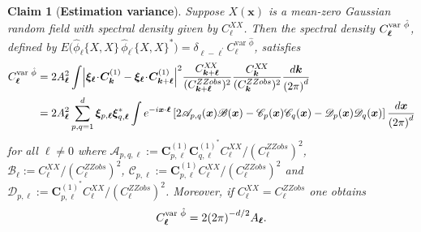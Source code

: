 \documentclass[10pt,noinfoline]{imsart}
\newtheorem{claim}{Claim}
\newcommand{\bs}{\boldsymbol}
\begin{document}
%
%

\begin{claim}[{\bf Estimation variance}]\label{thm: quantify the var fluctuations of hat phi}
    Suppose $X(\bs x)$ is a mean-zero Gaussian random field with spectral density given by $C^{X\!X}_{\bs \ell}$.
    Then the spectral density $C_{\bs\ell}^{\text{\rm var }\hat{\phi}}$, defined by $E\big(\hat\phi_{\bs \ell}\{X,\!X\} \, \hat\phi_{\bs \ell^\prime}\{X,\!X\}^*\big) =  \delta^{\phantom{*}}_{\bs \ell-\bs \ell^\prime} C^{\text{var }\hat\phi}_{\bs \ell}$, satisfies
    \begin{align}
        C_{\bs\ell}^{\text{\rm var }\hat{\phi}}
        &= 2 A_{\bs\ell}^2
        \int
        \Bigl|\bs\xi_{\bs\ell}\!\cdot\!\bs C^{{(1)}}_{\bs k} - \bs\xi_{\bs\ell}\!\cdot\! \bs C^{{(1)}}_{\bs k+\bs \ell}\Bigr|^2
        \frac{C^{X\!X}_{\bs k+\bs\ell}}{(C^{ZZobs}_{\bs k+\bs\ell})^2}
        \frac{C^{X\!X}_{\bs k}}{(C^{ZZobs}_{\bs k})^2}
         \frac{d\bs k}{{(2\pi)}^{d}} \label{appendix, claim raw var} \\
        &= 2 A_{\bs\ell}^2  \sum_{p,q = 1}^d\bs\xi_{p,\bs\ell}\bs\xi^*_{q,\bs\ell}\int e^{-i\bs x\cdot\bs \ell} \left[2\mathscr A_{p,q}(\bs x)\mathscr B(\bs x)  - \mathscr C_{p}(\bs x)\mathscr C_{q}(\bs x) -  \mathscr D_{p}(\bs x)\mathscr D_{q}(\bs x)\right]  \frac{d\bs x}{{(2\pi)}^{d}} \label{appendix, claim fast var}
    \end{align}
    for all $\bs \ell\neq 0$
    where $\mathscr A_{p,q, \bs \ell}:= \bs C^{(1)}_{p,\bs \ell} \bs C^{{(1)}^*}_{q,\bs \ell} C^{X\!X}_{\bs\ell} / (C^{ZZobs}_{\bs \ell})^2$, $\mathscr B_\ell:=  C^{X\!X}_{\bs\ell} / (C^{ZZobs}_{\bs\ell})^2$, $\mathscr C_{p,\bs\ell}:= \bs C^{(1)}_{p,\bs\ell}  C^{X\!X}_{\bs\ell} / (C^{ZZobs}_{\bs\ell})^2$ and $\mathscr D_{p,\bs\ell}:= \bs C^{{(1)}^*}_{p,\bs\ell}  C^{X\!X}_{\bs\ell} / (C^{ZZobs}_{\bs\ell})^2$.
    Moreover, if $C_{\bs\ell}^{X\!X} = C^{ZZobs}_{\bs\ell}$  one obtains
    \begin{equation}
    C_{\bs\ell}^{\text{\rm var }\hat{\phi}} =  2{(2\pi)}^{-d/2} A_{\bs\ell}.
    \end{equation}
\end{claim}
\end{document}
